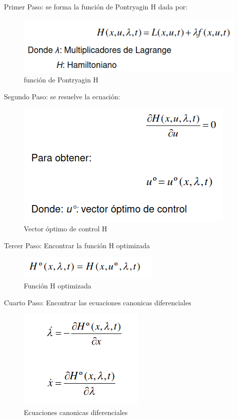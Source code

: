 \documentclass[12pt,letterpaper]{article}
\begin{document}
Primer Paso: se forma la función de Pontryagin H dada por:
\begin{figure}[H]
    \centering
    \includegraphics[scale=0.55]{EL5841_reporte/im08.png}
    \caption{función de Pontryagin H \cite{Mariano}   }
    \label{fig:MV4}
\end{figure}
Segundo Paso: se resuelve la ecuación:
\begin{figure}[H]
    \centering
    \includegraphics[scale=0.55]{EL5841_reporte/im09.png}
    \caption{Vector óptimo de control H \cite{Mariano}   }
    \label{fig:MV4}
\end{figure}
Tercer Paso: Encontrar la función H optimizada
\begin{figure}[H]
    \centering
    \includegraphics[scale=0.55]{EL5841_reporte/im10.png}
    \caption{Función H optimizada \cite{Mariano}   }
    \label{fig:MV4}
\end{figure}
Cuarto Paso: Encontrar las ecuaciones canonicas diferenciales
\begin{figure}[H]
    \centering
    \includegraphics[scale=0.55]{EL5841_reporte/im11.png}
    \caption{Ecuaciones canonicas diferenciales \cite{Mariano}   }
    \label{fig:MV4}
\end{figure}
\end{document}
